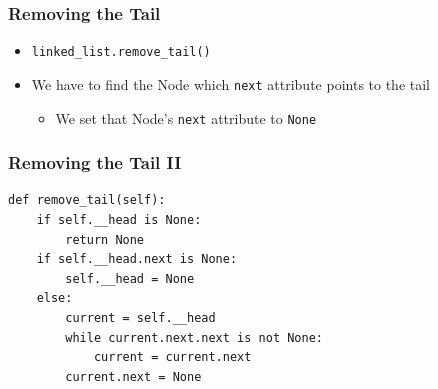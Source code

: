 \documentclass[11pt]{beamer}
\begin{document}
	\begin{frame}
		\frametitle{Removing the Tail}
		\begin{itemize}
			\item \lstinline|linked_list.remove_tail()|
			\item We have to find the Node which \texttt{next} attribute points to the tail
			\begin{itemize}
				\item We set that Node's \texttt{next} attribute to \lstinline|None|
			\end{itemize}
		\end{itemize}
		\vspace{0.7cm}
		\begin{center}
		\end{center}
	\end{frame}

	\begin{frame}[fragile]
		\frametitle{Removing the Tail II}
\begin{lstlisting}
def remove_tail(self):
	if self.__head is None:
		return None
	if self.__head.next is None:
		self.__head = None
	else:
		current = self.__head
		while current.next.next is not None:
			current = current.next
		current.next = None
\end{lstlisting}
	\end{frame}
\end{document}
